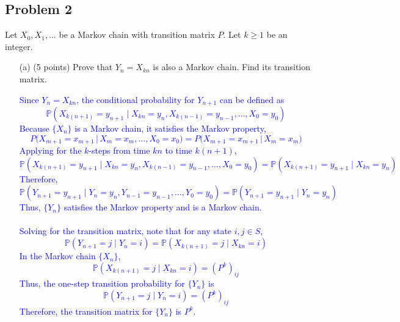 \documentclass{article}
\begin{document}
\subsection*{Problem 2} Let $X_0, X_1, \dots$ be a Markov chain with transition matrix $P$. Let $k \geq 1$ be an integer.
\begin{enumerate}
    \item[(a)] (5 points) Prove that $Y_n = X_{kn}$ is also a Markov chain. Find its transition matrix.

            \textcolor{blue}{
                Since $Y_n = X_{kn}$, the conditional probability for $Y_{n+1}$ can be defined as
\[
\mathbb{P}\left(X_{k(n+1)} = y_{n+1} \mid X_{kn} = y_n, X_{k(n-1)} = y_{n-1}, \dots, X_0 = y_0\right)
\]
Because $\{X_n\}$ is a Markov chain, it satisfies the Markov property,
 \[
P\bigl(X_{m+1} = x_{m+1} \,\big\vert\, X_m = x_m, \dots, X_0 = x_0\bigr)
= P\bigl(X_{m+1} = x_{m+1} \,\big\vert\, X_m = x_m\bigr)
\]
Applying for the $k$-steps from time $kn$ to time $k(n+1)$,
\[
\mathbb{P}\left(X_{k(n+1)} = y_{n+1} \mid X_{kn} = y_n, X_{k(n-1)} = y_{n-1}, \dots, X_0 = y_0\right)
= \mathbb{P}\left(X_{k(n+1)} = y_{n+1} \mid X_{kn} = y_n\right)
\]
Therefore,
\[
\mathbb{P}\left(Y_{n+1} = y_{n+1} \mid Y_n = y_n, Y_{n-1} = y_{n-1}, \dots, Y_0 = y_0\right)
= \mathbb{P}\left(Y_{n+1} = y_{n+1} \mid Y_n = y_n\right)
\]
Thus, $\{Y_n\}$ satisfies the Markov property and is a Markov chain. \\ \\ 
Solving for the transition matrix, note that for any state $i,j \in S$,
\[
\mathbb{P}(Y_{n+1} = j \mid Y_n = i) = \mathbb{P}(X_{k(n+1)} = j \mid X_{kn} = i)
\]
In the Markov chain $\{X_n\}$, 
\[
\mathbb{P}(X_{k(n+1)} = j \mid X_{kn} = i) = (P^k)_{ij}
\]
Thus, the one-step transition probability for $\{Y_n\}$ is
\[
\mathbb{P}(Y_{n+1} = j \mid Y_n = i) = (P^k)_{ij}
\]
Therefore, the transition matrix for $\{Y_n\}$ is $P^k$.
}
\end{enumerate}
\end{document}
